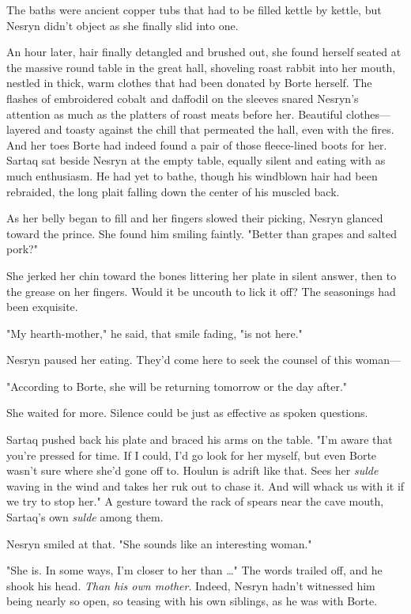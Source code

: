 The baths were ancient copper tubs that had to be filled kettle by kettle, but Nesryn didn't object as she finally slid into one.

An hour later, hair finally detangled and brushed out, she found herself seated at the massive round table in the great hall, shoveling roast rabbit into her mouth, nestled in thick, warm clothes that had been donated by Borte herself.
The flashes of embroidered cobalt and daffodil on the sleeves snared Nesryn's attention as much as the platters of roast meats before her.
Beautiful clothes--- layered and toasty against the chill that permeated the hall, even with the fires.
And her toes  Borte had indeed found a pair of those fleece-lined boots for her.
Sartaq sat beside Nesryn at the empty table, equally silent and eating with as much enthusiasm.
He had yet to bathe, though his windblown hair had been rebraided, the long plait falling down the center of his muscled back.

As her belly began to fill and her fingers slowed their picking, Nesryn glanced toward the prince.
She found him smiling faintly.
"Better than grapes and salted pork?"

She jerked her chin toward the bones littering her plate in silent answer, then to the grease on her fingers.
Would it be uncouth to lick it off?
The seasonings had been exquisite.

"My hearth-mother," he said, that smile fading, "is not here."

Nesryn paused her eating.
They'd come here to seek the counsel of this woman---

"According to Borte, she will be returning tomorrow or the day after."

She waited for more.
Silence could be just as effective as spoken questions.

Sartaq pushed back his plate and braced his arms on the table.
"I'm aware that you're pressed for time.
If I could, I'd go look for her myself, but even Borte wasn't sure where she'd gone off to.
Houlun is  adrift like that.
Sees her \emph{sulde} waving in the wind and takes her ruk out to chase it.
And will whack us with it if we try to stop her."
A gesture toward the rack of spears near the cave mouth, Sartaq's own \emph{sulde} among them.

Nesryn smiled at that.
"She sounds like an interesting woman."

"She is.
In some ways, I'm closer to her than \ldots" The words trailed off, and he shook his head.
\emph{Than his own mother}.
Indeed, Nesryn hadn't witnessed him being nearly so open, so teasing with his own siblings, as he was with Borte.

